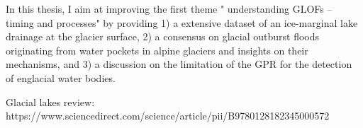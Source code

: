 In this thesis, I aim at improving the first theme " understanding GLOFs – timing and processes" by providing 1) a extensive dataset of an ice-marginal lake drainage at the glacier surface, 2) a consensus on glacial outburst floods originating from water pockets in alpine glaciers and insights on their mechanisms, and 3) a discussion on the limitation of the GPR for the detection of englacial water bodies. 








Glacial lakes review: https://www.sciencedirect.com/science/article/pii/B9780128182345000572







